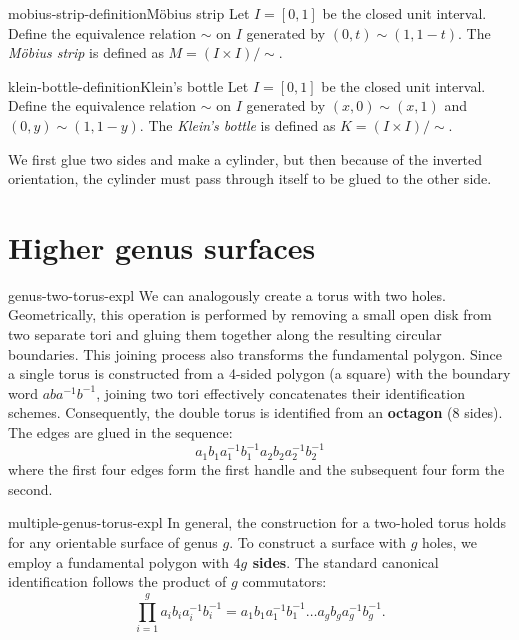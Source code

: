 \documentclass[preview]{standalone}
\begin{document}
\begin{snippetdefinition}{mobius-strip-definition}{Möbius strip}
    Let \(I = [0,1]\) be the closed unit interval.
    Define the equivalence relation \(\sim\) on \(I\) generated
    by \((0,t) \sim (1,1-t)\).
    The \emph{Möbius strip} is defined as \(M = (I \times I)/\sim\).
\end{snippetdefinition}


\begin{snippetdefinition}{klein-bottle-definition}{Klein's bottle}
    Let \(I = [0,1]\) be the closed unit interval.
    Define the equivalence relation \(\sim\) on \(I\) generated
    by \((x,0) \sim (x,1)\) and \((0,y) \sim (1,1-y)\).
    The \emph{Klein's bottle} is defined as \(K = (I \times I)/\sim\).
\end{snippetdefinition}

\begin{plainhtml}
    We first glue two sides and make a cylinder, but then because of the inverted orientation, the cylinder must pass through itself to be glued to the other side.
\end{plainhtml}


\section{Higher genus surfaces}

\begin{snippet}{genus-two-torus-expl}
    We can analogously create a torus with two holes.
    Geometrically, this operation is performed by removing a small
    open disk from two separate tori and gluing them together along
    the resulting circular boundaries.
    This joining process also transforms the fundamental polygon.
    Since a single torus is constructed from a 4-sided polygon
    (a square) with the boundary word $aba^{-1}b^{-1}$,
    joining two tori effectively concatenates their identification schemes.
    Consequently, the double torus is identified from an \textbf{octagon}
    (8 sides). The edges are glued in the sequence:
    \[
        a_1 b_1 a_1^{-1} b_1^{-1} a_2 b_2 a_2^{-1} b_2^{-1}
    \]
    where the first four edges form the first handle and the subsequent
    four form the second.
\end{snippet}


\begin{snippet}{multiple-genus-torus-expl}
    In general, the construction for a two-holed torus holds for any orientable
    surface of genus $g$.
    To construct a surface with $g$ holes, we employ a
    fundamental polygon with \textbf{$4g$ sides}.
    The standard canonical identification follows the product of $g$ commutators:
    \[
        \prod_{i=1}^{g} a_i b_i a_i^{-1} b_i^{-1} = a_1 b_1 a_1^{-1} b_1^{-1} \dots a_g b_g a_g^{-1} b_g^{-1}.
    \]
\end{snippet}
\end{document}
